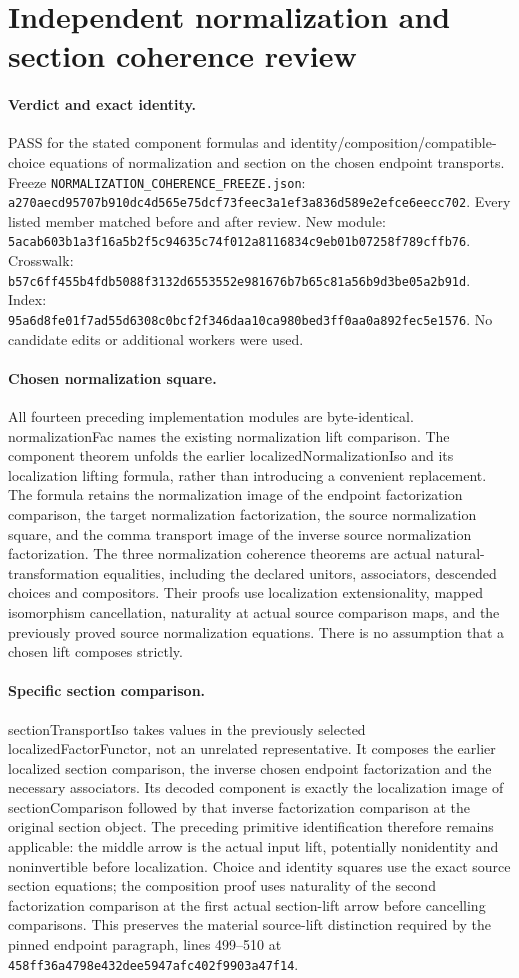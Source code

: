 \documentclass{article}
\begin{document}
\section*{Independent normalization and section coherence review}
\paragraph{Verdict and exact identity.} PASS for the stated component formulas and identity/composition/compatible-choice equations of normalization and section on the chosen endpoint transports. Freeze \texttt{NORMALIZATION\_COHERENCE\_FREEZE.json}: \texttt{a270aecd95707b910dc4d565e75dcf73feec3a1ef3a836d589e2efce6eecc702}. Every listed member matched before and after review. New module: \texttt{5acab603b1a3f16a5b2f5c94635c74f012a8116834c9eb01b07258f789cffb76}. Crosswalk: \texttt{b57c6ff455b4fdb5088f3132d6553552e981676b7b65c81a56b9d3be05a2b91d}. Index: \texttt{95a6d8fe01f7ad55d6308c0bcf2f346daa10ca980bed3ff0aa0a892fec5e1576}. No candidate edits or additional workers were used.
\paragraph{Chosen normalization square.} All fourteen preceding implementation modules are byte-identical. normalizationFac names the existing normalization lift comparison. The component theorem unfolds the earlier localizedNormalizationIso and its localization lifting formula, rather than introducing a convenient replacement. The formula retains the normalization image of the endpoint factorization comparison, the target normalization factorization, the source normalization square, and the comma transport image of the inverse source normalization factorization. The three normalization coherence theorems are actual natural-transformation equalities, including the declared unitors, associators, descended choices and compositors. Their proofs use localization extensionality, mapped isomorphism cancellation, naturality at actual source comparison maps, and the previously proved source normalization equations. There is no assumption that a chosen lift composes strictly.
\paragraph{Specific section comparison.} sectionTransportIso takes values in the previously selected localizedFactorFunctor, not an unrelated representative. It composes the earlier localized section comparison, the inverse chosen endpoint factorization and the necessary associators. Its decoded component is exactly the localization image of sectionComparison followed by that inverse factorization comparison at the original section object. The preceding primitive identification therefore remains applicable: the middle arrow is the actual input lift, potentially nonidentity and noninvertible before localization. Choice and identity squares use the exact source section equations; the composition proof uses naturality of the second factorization comparison at the first actual section-lift arrow before cancelling comparisons. This preserves the material source-lift distinction required by the pinned endpoint paragraph, lines 499--510 at \texttt{458ff36a4798e432dee5947afc402f9903a47f14}.
\end{document}
